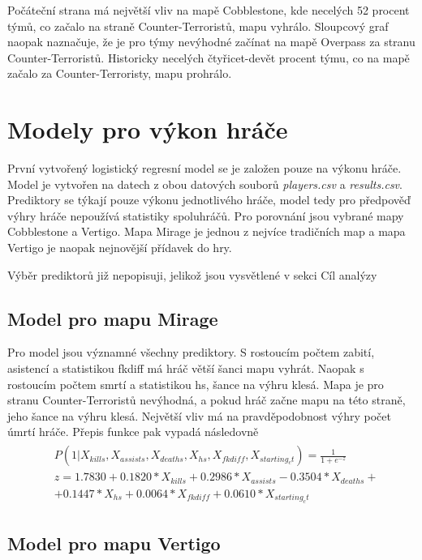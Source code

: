 Počáteční strana má největší vliv na mapě Cobblestone, kde necelých 52 procent týmů, co začalo na straně Counter-Terroristů, mapu vyhrálo. Sloupcový graf naopak naznačuje, že 
je pro týmy nevýhodné začínat na mapě Overpass za stranu Counter-Terroristů. Historicky necelých čtyřicet-devět procent týmu, co na mapě začalo za Counter-Terroristy, mapu prohrálo.

\section{Modely pro výkon hráče}
První vytvořený logistický regresní model se je založen pouze na výkonu hráče. Model je vytvořen na datech z obou datových souborů \textit{players.csv} a \textit{results.csv}.
Prediktory se týkají pouze výkonu jednotlivého hráče, model tedy pro předpověď výhry hráče nepoužívá statistiky spoluhráčů. Pro porovnání jsou vybrané mapy Cobblestone a Vertigo.
Mapa Mirage je jednou z nejvíce tradičních map a mapa Vertigo je naopak nejnovější přídavek do hry.

{\color{green}
Výběr prediktorů již nepopisuji, jelikož jsou vysvětlené v sekci Cíl analýzy
}

\subsection{Model pro mapu Mirage}

Pro model jsou významné všechny prediktory. S rostoucím počtem zabití, asistencí a statistikou fkdiff má hráč větší šanci mapu vyhrát. Naopak s rostoucím počtem smrtí a 
statistikou hs, šance na výhru klesá. Mapa je pro stranu Counter-Terroristů nevýhodná, a pokud hráč začne mapu na této straně, jeho šance na výhru klesá. Největší vliv
má na pravděpodobnost výhry počet úmrtí hráče. Přepis funkce pak vypadá následovně
\begin{align}
    \begin{split}
        &P(1 | X_{kills}, X_{assists}, X_{deaths}, X_{hs}, X_{fkdiff}, X_{starting_ct}) = \frac{1}{1 + e^{-z}} \\
        &z = 1.7830 + 0.1820*X_{kills} + 0.2986*X_{assists} - 0.3504*X_{deaths} + \\
        &+ 0.1447*X_{hs} + 0.0064*X_{fkdiff} + 0.0610*X_{starting_ct}
    \end{split}
\end{align}



\subsection{Model pro mapu Vertigo}


